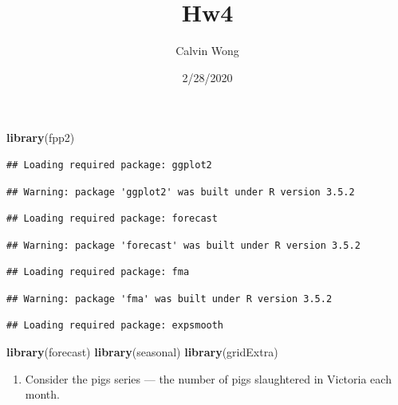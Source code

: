 \documentclass[]{article}
\title{Hw4}
\author{Calvin Wong}
\date{2/28/2020}
\newenvironment{Shaded}{\begin{snugshade}}{\end{snugshade}}
\newcommand{\KeywordTok}[1]{\textcolor[rgb]{0.13,0.29,0.53}{\textbf{#1}}}
\newcommand{\NormalTok}[1]{#1}
\providecommand{\tightlist}{%
  \setlength{\itemsep}{0pt}\setlength{\parskip}{0pt}}
\begin{document}
\maketitle

\begin{Shaded}
\begin{Highlighting}[]
\KeywordTok{library}\NormalTok{(fpp2)}
\end{Highlighting}
\end{Shaded}

\begin{verbatim}
## Loading required package: ggplot2
\end{verbatim}

\begin{verbatim}
## Warning: package 'ggplot2' was built under R version 3.5.2
\end{verbatim}

\begin{verbatim}
## Loading required package: forecast
\end{verbatim}

\begin{verbatim}
## Warning: package 'forecast' was built under R version 3.5.2
\end{verbatim}

\begin{verbatim}
## Loading required package: fma
\end{verbatim}

\begin{verbatim}
## Warning: package 'fma' was built under R version 3.5.2
\end{verbatim}

\begin{verbatim}
## Loading required package: expsmooth
\end{verbatim}

\begin{Shaded}
\begin{Highlighting}[]
\KeywordTok{library}\NormalTok{(forecast)}
\KeywordTok{library}\NormalTok{(seasonal)}
\KeywordTok{library}\NormalTok{(gridExtra)}
\end{Highlighting}
\end{Shaded}

\begin{enumerate}
\def\labelenumi{\arabic{enumi}.}
\tightlist
\item
  Consider the pigs series --- the number of pigs slaughtered in
  Victoria each month.
\end{enumerate}
\end{document}
